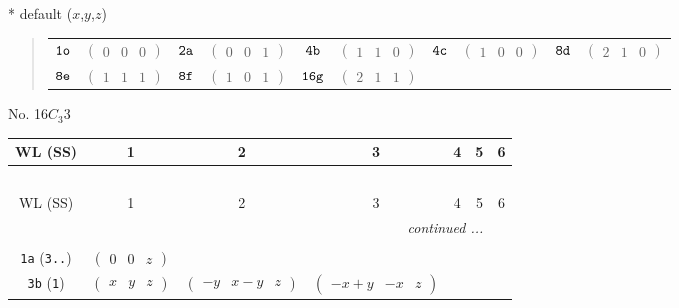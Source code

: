\documentclass[fleqn,9pt,landscape]{jsarticle}
\begin{document}
* default ($x$,$y$,$z$)
\begin{quote}
\begin{tabular}{cccccccccc}
$ {\tt 1o} $ & $ \begin{pmatrix} 0 & 0 & 0 \end{pmatrix} $ & $ {\tt 2a} $ & $ \begin{pmatrix} 0 & 0 & 1 \end{pmatrix} $ & $ {\tt 4b} $ & $ \begin{pmatrix} 1 & 1 & 0 \end{pmatrix} $ & $ {\tt 4c} $ & $ \begin{pmatrix} 1 & 0 & 0 \end{pmatrix} $ & $ {\tt 8d} $ & $ \begin{pmatrix} 2 & 1 & 0 \end{pmatrix} $ \\
$ {\tt 8e} $ & $ \begin{pmatrix} 1 & 1 & 1 \end{pmatrix} $ & $ {\tt 8f} $ & $ \begin{pmatrix} 1 & 0 & 1 \end{pmatrix} $ & $ {\tt 16g} $ & $ \begin{pmatrix} 2 & 1 & 1 \end{pmatrix} $ & $  $ & $  $ & $  $ & $  $
\end{tabular}
\end{quote}
\newpage
No. 16\quad$C_{3}$\quad$3$\quad[ trigonal ]
\begin{center}
\renewcommand{\arraystretch}{1.2}
\begin{longtable}{ccccccc}
 \hline \hline
WL (SS) & 1 & 2 & 3 & 4 & 5 & 6 \\ \hline \endfirsthead

\multicolumn{6}{l}{\tablename\ \thetable{}} \\
 \hline \hline
WL (SS) & 1 & 2 & 3 & 4 & 5 & 6 \\ \hline \endhead

 \hline \hline
\multicolumn{6}{r}{\footnotesize\it continued ...} \\ \endfoot

 \hline \hline
\multicolumn{6}{r}{} \\ \endlastfoot

{\tt 1a} ({\tt 3..}) & $ \begin{pmatrix} 0 & 0 & z \end{pmatrix} $ & $  $ & $  $ \\ \hline
{\tt 3b} ({\tt 1}) & $ \begin{pmatrix} x & y & z \end{pmatrix} $ & $ \begin{pmatrix} - y & x - y & z \end{pmatrix} $ & $ \begin{pmatrix} - x + y & - x & z \end{pmatrix} $ \\
\end{longtable}
\end{center}
\end{document}
